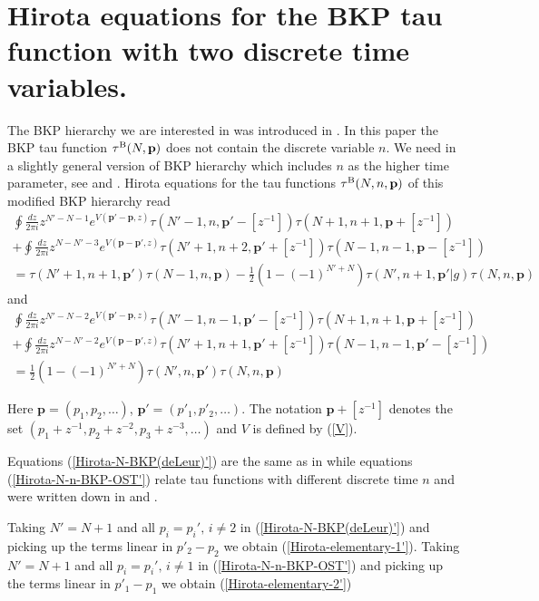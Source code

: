 \documentclass[a4paper,10pt]{article}
\newcommand{\bpow}{\mathbf{p}}
\theoremstyle{plain}
\theoremstyle{remark}
\def\bea{\begin{eqnarray}}
\def\eea{\end{eqnarray}}
\begin{document}
\appendix



 \section{Hirota equations for the BKP tau function with two discrete time variables.\label{N-n-BKP-Hirota}}

 The BKP hierarchy we are interested in was introduced in \cite{KvdLbispec}.
 In this paper the BKP tau function $\tau^{\rm B}(N,\bpow)$ does not contain the discrete variable $n$.
 We need in a slightly general version of BKP hierarchy which includes $n$ as the higher time parameter,
 see \cite{OST-I} and \cite{LeurO-2014}.
 Hirota equations for the tau functions $\tau^{\rm B}(N,n,\bpow)$ of this modified BKP hierarchy read
\bea\label{Hirota-N-n-BKP-OST'}
  \oint\frac{dz}{2\pi i}z^{N'-N-1}e^{V(\bpow'-\bpow,z)}
  \tau(N'-1,n,\bpow'-[z^{-1}])
  \tau(N+1,n+1,\bpow+[z^{-1}]) \nonumber\\
+ \oint\frac{dz}{2\pi i}z^{N-N'-3}e^{V(\bpow-\bpow',z)}
  \tau(N'+1,n+2,\bpow'+[z^{-1}])
  \tau(N-1,n-1,\bpow-[z^{-1}]) \nonumber\\
=
  \tau(N'+1,n+1,\bpow')
  \tau(N-1,n,\bpow)
- \frac{1}{2}(1-(-1)^{N'+N})
  \tau(N',n+1,\bpow'|g)\tau(N,n,\bpow)
\eea
 and
\bea\label{Hirota-N-BKP(deLeur)'}
  \oint\frac{dz}{2\pi i}z^{N'-N-2}e^{V(\bpow'-\bpow,z)}
  \tau(N'-1,n-1,\bpow'-[z^{-1}])\tau(N+1,n+1,\bpow +[z^{-1}]) \nonumber\\
+ \oint\frac{dz}{2\pi i}z^{N-N'-2}e^{V(\bpow-\bpow',z)}
  \tau(N'+1,n+1,\bpow'+[z^{-1}])\tau(N-1,n-1,\bpow'-[z^{-1}]) \nonumber\\
= \frac{1}{2}(1-(-1)^{N'+N})\tau(N',n,\bpow')\tau(N,n,\bpow)
\eea





 Here $\bpow=(p_1,p_2,\dots)$, $\bpow'=(p'_1,p'_2,\dots)$.
The notation $\bpow +[z^{-1}]$ denotes the set $\left( p_1+z^{-1},p_2+z^{-2}, p_3+z^{-3},\dots \right)$ and
$V$ is defined by (\ref{V}).

Equations (\ref{Hirota-N-BKP(deLeur)'}) are the same as in \cite{KvdLbispec} while equations
(\ref{Hirota-N-n-BKP-OST'}) relate tau functions with different discrete time $n$ and were written down
in \cite{OST-I} and \cite{LeurO-2014}.

 Taking $N'=N+1$ and all $p_i=p_i',\,i\neq 2$ in (\ref{Hirota-N-BKP(deLeur)'})
and picking up the terms linear in $p'_2-p_2$ we obtain (\ref{Hirota-elementary-1'}).
Taking $N'=N+1$ and all $p_i=p_i',\,i\neq 1$ in (\ref{Hirota-N-n-BKP-OST'})
and picking up the terms linear in $p'_1-p_1$ we obtain (\ref{Hirota-elementary-2'})
\end{document}
